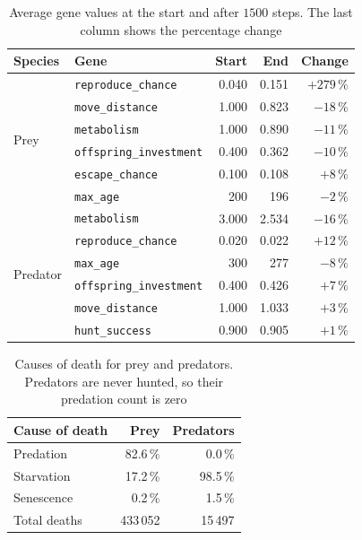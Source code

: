 \documentclass[english]{projectreport}
\begin{document}
\begin{table}[ht]
  \centering
  \caption{Average gene values at the start and after $1500$ steps. The last column shows the percentage change}
  \label{tab:genes}
  \begin{tabular}{llrrr}
    \toprule
    Species & Gene & Start & End & Change \\
    \midrule
    \multirow{6}{*}{Prey}
      & \texttt{reproduce\_chance}     & 0.040 & 0.151 & $+279\,\%$ \\
      & \texttt{move\_distance}        & 1.000 & 0.823 & $-18\,\%$ \\
      & \texttt{metabolism}            & 1.000 & 0.890 & $-11\,\%$ \\
      & \texttt{offspring\_investment} & 0.400 & 0.362 & $-10\,\%$ \\
      & \texttt{escape\_chance}        & 0.100 & 0.108 & $+8\,\%$  \\
      & \texttt{max\_age}              & 200   & 196   & $-2\,\%$  \\
    \midrule
    \multirow{6}{*}{Predator}
      & \texttt{metabolism}            & 3.000 & 2.534 & $-16\,\%$ \\
      & \texttt{reproduce\_chance}     & 0.020 & 0.022 & $+12\,\%$ \\
      & \texttt{max\_age}              & 300   & 277   & $-8\,\%$  \\
      & \texttt{offspring\_investment} & 0.400 & 0.426 & $+7\,\%$  \\
      & \texttt{move\_distance}        & 1.000 & 1.033 & $+3\,\%$  \\
      & \texttt{hunt\_success}         & 0.900 & 0.905 & $+1\,\%$  \\
    \bottomrule
  \end{tabular}
\end{table}

\begin{table}[ht]
  \centering
  \caption{Causes of death for prey and predators. Predators are never hunted, so their predation count is zero}
  \label{tab:deaths}
  \begin{tabular}{lrr}
    \toprule
    Cause of death & Prey & Predators \\
    \midrule
    Predation  & 82.6\,\% & 0.0\,\%  \\
    Starvation & 17.2\,\% & 98.5\,\% \\
    Senescence & 0.2\,\%  & 1.5\,\%  \\
    \midrule
    Total deaths & 433\,052 & 15\,497 \\
    \bottomrule
  \end{tabular}
\end{table}
\end{document}
